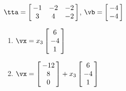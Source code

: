 {$\tta = \left[\hskip -3pt \begin{array}{ccc} -1&-2&-2\\  3&4&-2
\end{array}\hskip -3pt \right] $, $\vb=\left[\hskip -3pt \begin{array}{c} -4\\  -4\end{array}\hskip -3pt \right]$}
{\begin{enumerate}
\item	 $\vx=x_3\left[\hskip -3pt \begin{array}{c} 6\\  -4\\  1\end{array}\hskip -3pt \right]$
\item	 $\vx=\left[\hskip -3pt \begin{array}{c} -12\\  8\\0\end{array}\hskip -3pt
\right]+x_3\left[\hskip -3pt \begin{array}{c} 6\\  -4\\  1\end{array}\hskip -3pt \right]$ 
\end{enumerate}
 }

 

 






